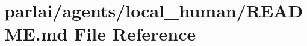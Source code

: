\hypertarget{parlai_2agents_2local__human_2README_8md}{}\section{parlai/agents/local\+\_\+human/\+R\+E\+A\+D\+ME.md File Reference}
\label{parlai_2agents_2local__human_2README_8md}
